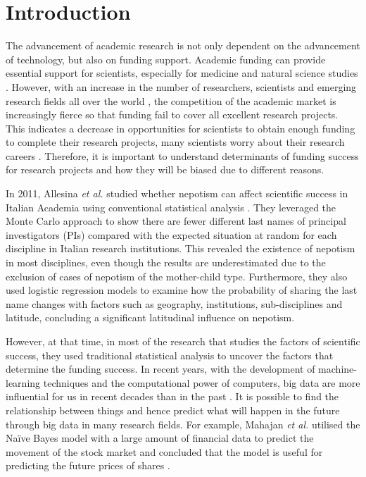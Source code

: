 \section{Introduction}

The advancement of academic research is not only dependent on the advancement of technology, but also on funding support. Academic funding can provide essential support for scientists, especially for medicine and natural science studies \cite{Magua2017}. However, with an increase in the number of researchers, scientists and emerging research fields all over the world \cite{david2014}, the competition of the academic market is increasingly fierce so that funding fail to cover all excellent research projects. This indicates a decrease in opportunities for scientists to obtain enough funding to complete their research projects, many scientists worry about their research careers \cite{Acuna2012}. Therefore, it is important to understand determinants of funding success for research projects and how they will be biased due to different reasons.

In 2011, Allesina \textit{et al.} studied whether nepotism can affect scientific success in Italian Academia using conventional statistical analysis \cite{allesina2011}. They leveraged the Monte Carlo approach to show there are fewer different last names of principal investigators (PIs) compared with the expected situation at random for each discipline in Italian research institutions. This revealed the existence of nepotism in most disciplines, even though the results are underestimated due to the exclusion of cases of nepotism of the mother-child type. Furthermore, they also used logistic regression models to examine how the probability of sharing the last name changes with factors such as geography, institutions, sub-disciplines and latitude, concluding a significant latitudinal influence on nepotism.

However, at that time, in most of the research that studies the factors of scientific success, they used traditional statistical analysis to uncover the factors that determine the funding success. In recent years, with the development of machine-learning techniques and the computational power of computers, big data are more influential for us in recent decades than in the past \cite{hilbert2016}. It is possible to find the relationship between things and hence predict what will happen in the future through big data in many research fields. For example, Mahajan \textit{et al.} utilised the Na{\"i}ve Bayes model with a large amount of financial data to predict the movement of the stock market and concluded that the model is useful for predicting the future prices of shares \cite{Kannan2016StockMP}.

